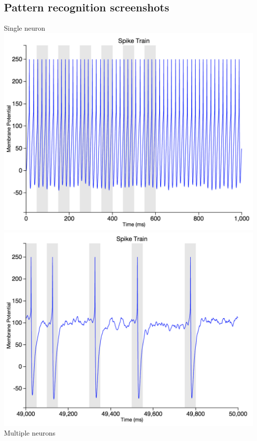 \documentclass[a4paper,11pt]{article}
\begin{document}
\begin{appendices}
\section{Pattern recognition screenshots}
Single neuron \\
\includegraphics[scale = 0.3]{single_pattern_beginning}
\includegraphics[scale = 0.3]{single_pattern_end} \\
Multiple neurons \\

\end{appendices}
\end{document}
